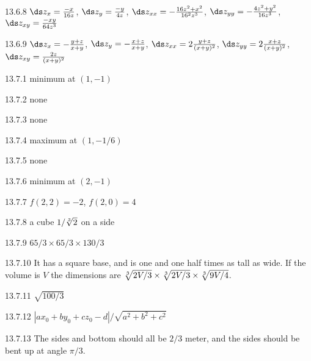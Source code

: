 \begin{Answer}{13.6.8}
$\ds z_x={-x\over16z}$,
$\ds z_y={-y\over4z}$,\hfill\break
$\ds z_{xx}=-{16z^2+x^2\over16^2z^3}$,\hfill\break
$\ds z_{yy}=-{4z^2+y^2\over16z^3}$,\hfill\break
$\ds z_{xy}={-xy\over64z^3}$
\end{Answer}
\begin{Answer}{13.6.9}
$\ds z_x=-{y+z\over x+y}$,
$\ds z_y=-{x+z\over x+y}$,\hfill\break
$\ds z_{xx}=2{y+z\over(x+y)^2}$,
$\ds z_{yy}=2{x+z\over(x+y)^2}$,\hfill\break
$\ds z_{xy}={2z\over(x+y)^2}$
\end{Answer}
\begin{Answer}{13.7.1}
minimum at $(1,-1)$
\end{Answer}
\begin{Answer}{13.7.2}
none
\end{Answer}
\begin{Answer}{13.7.3}
none
\end{Answer}
\begin{Answer}{13.7.4}
maximum at $(1,-1/6)$
\end{Answer}
\begin{Answer}{13.7.5}
none
\end{Answer}
\begin{Answer}{13.7.6}
minimum at $(2,-1)$
\end{Answer}
\begin{Answer}{13.7.7}
$f(2,2)=-2$, $f(2,0)=4$
\end{Answer}
\begin{Answer}{13.7.8}
a cube $1/\root 3 \of {2}$ on a side
\end{Answer}
\begin{Answer}{13.7.9}
$65/3\times 65/3\times 130/3$
\end{Answer}
\begin{Answer}{13.7.10}
It has a square base, and is one and one half times as tall as wide.
If the volume is $V$ the dimensions are $\root 3 \of {2V/3}\times
\root 3 \of {2V/3}\times \root 3\of {9V/4}$.
\end{Answer}
\begin{Answer}{13.7.11}
$\sqrt{100/3}$
\end{Answer}
\begin{Answer}{13.7.12}
$|ax_0+by_0+cz_0-d|/\sqrt{a^2+b^2+c^2}$
\end{Answer}
\begin{Answer}{13.7.13}
The sides and bottom should all be $2/3$ meter, and the sides
should be bent up at angle $\pi/3$.
\end{Answer}
